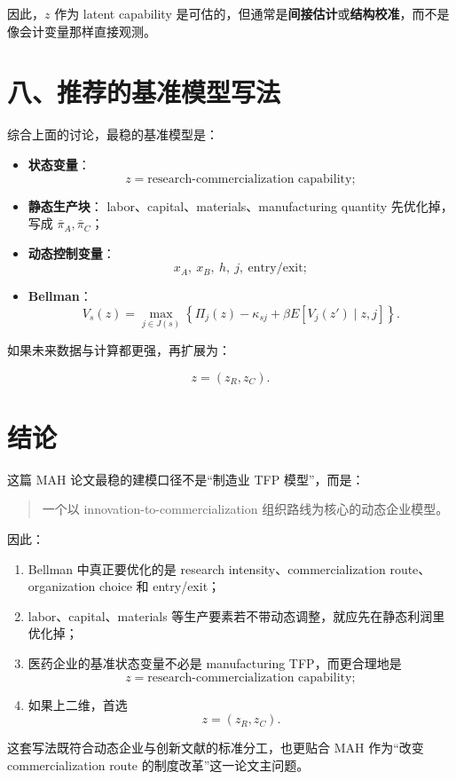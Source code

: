 \documentclass[12pt,fontset=none]{ctexart}
\begin{document}
因此，\(z\) 作为 latent capability 是可估的，但通常是\textbf{间接估计}或\textbf{结构校准}，而不是像会计变量那样直接观测。

\section{八、推荐的基准模型写法}

综合上面的讨论，最稳的基准模型是：

\begin{itemize}[leftmargin=2em]
    \item \textbf{状态变量}：
    \[
    z=\text{research-commercialization capability};
    \]
    \item \textbf{静态生产块}：
    labor、capital、materials、manufacturing quantity 先优化掉，写成 \(\bar{\pi}_A,\bar{\pi}_C\)；
    \item \textbf{动态控制变量}：
    \[
    x_A,\ x_B,\ h,\ j,\ \text{entry/exit};
    \]
    \item \textbf{Bellman}：
    \[
    V_s(z)=\max_{j\in J(s)}
    \left\{
    \Pi_j(z)-\kappa_{sj}+\beta E[V_j(z')\mid z,j]
    \right\}.
    \]
\end{itemize}

如果未来数据与计算都更强，再扩展为：

\[
z=(z_R,z_C).
\]

\section{结论}

这篇 MAH 论文最稳的建模口径不是“制造业 TFP 模型”，而是：

\begin{quote}
一个以 innovation-to-commercialization 组织路线为核心的动态企业模型。
\end{quote}

因此：

\begin{enumerate}[leftmargin=2em]
    \item Bellman 中真正要优化的是 research intensity、commercialization route、organization choice 和 entry/exit；
    \item labor、capital、materials 等生产要素若不带动态调整，就应先在静态利润里优化掉；
    \item 医药企业的基准状态变量不必是 manufacturing TFP，而更合理地是
    \[
    z=\text{research-commercialization capability};
    \]
    \item 如果上二维，首选
    \[
    z=(z_R,z_C).
    \]
\end{enumerate}

这套写法既符合动态企业与创新文献的标准分工，也更贴合 MAH 作为“改变 commercialization route 的制度改革”这一论文主问题。
\end{document}
